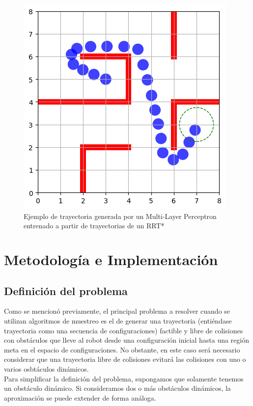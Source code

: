 \documentclass[spanish,mexico]{article}
\numberwithin{equation}{section}
\theoremstyle{definition}
\theoremstyle{remark}
\begin{document}
\begin{figure}[hbtp]
\centering
\includegraphics[scale=0.65]{img/MLPexample.png}
\caption{Ejemplo de trayectoria generada por un Multi-Layer Perceptron entrenado a partir de trayectorias de un RRT*}
\end{figure}

\section{Metodología e Implementación}
\subsection{Definición del problema}
Como se mencionó previamente, el principal problema a resolver cuando se utilizan algoritmos de muestreo es el de generar una trayectoria (entiéndase trayectoria como una secuencia de configuraciones) factible y libre de colisiones con obstáculos que lleve al robot desde una configuración inicial hasta una región meta en el espacio de configuraciones. No obstante, en este caso será necesario considerar que una trayectoria libre de colisiones evitará las colisiones con uno o varios osbtáculos dinámicos.\\

Para simplificar la definición del problema, supongamos que solamente tenemos un obstáculo dinámico. Si consideramos dos o más obstáculos dinámicos, la aproximación se puede extender de forma análoga.\\
\end{document}
